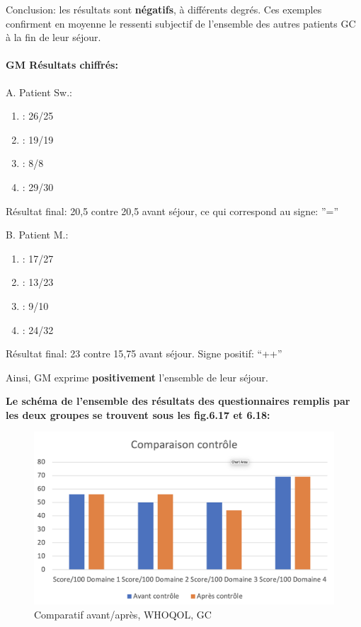         Conclusion: les résultats sont \textbf{négatifs}, à différents degrés.
        Ces exemples confirment en moyenne 
        le ressenti subjectif de l'ensemble des autres patients GC à la fin de leur séjour.

        \paragraph{GM Résultats chiffrés:}


        
   A. Patient Sw.:
	\begin{enumerate}
 		\item : 26/25 
 		\item : 19/19
 		\item : 8/8
 		\item : 29/30
 	\end{enumerate}
        Résultat final: 20,5 contre 20,5 avant séjour, ce qui
        correspond au signe:  ''=''

        
        B. Patient M.:
	\begin{enumerate}
 		\item : 17/27 
 		\item : 13/23
 		\item : 9/10
 		\item : 24/32
                \end{enumerate}
                 Résultat final: 23 contre 15,75 avant séjour. Signe positif:  ``++''

                 Ainsi,  GM exprime
                 \textbf{positivement }
                 l'ensemble de leur séjour.

               \textbf{ Le schéma de l'ensemble des résultats des
                 questionnaires remplis par les deux groupes se trouvent sous les fig.6.17 et 6.18:}
                
\begin{figure}
\centering
\includegraphics[width=0.7\linewidth]{images/Compcontrole.png}
\caption[Schéma du déroulement]{Comparatif avant/après, 
  WHOQOL, GC}
       
\label{groupecontroleimage1}
\end{figure}

